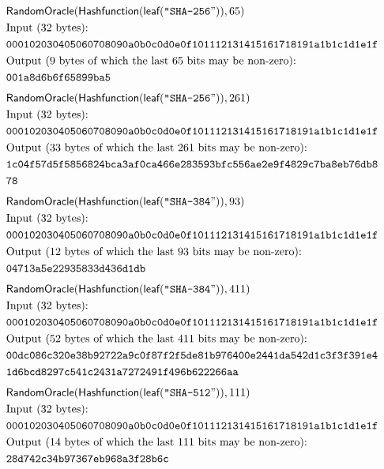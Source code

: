 \begin{align*}
&\textsf{RandomOracle}(\textsf{Hashfunction}(\textsf{leaf}(\texttt{"SHA-256}")),65)\\
&\textrm{Input (32 bytes):}\\
&\texttt{000102030405060708090a0b0c0d0e0f101112131415161718191a1b1c1d1e1f}\\
&\textrm{Output (9 bytes of which the last 65 bits may be non-zero):}\\
&\texttt{001a8d6b6f65899ba5}
\end{align*}
\begin{align*}
&\textsf{RandomOracle}(\textsf{Hashfunction}(\textsf{leaf}(\texttt{"SHA-256}")),261)\\
&\textrm{Input (32 bytes):}\\
&\texttt{000102030405060708090a0b0c0d0e0f101112131415161718191a1b1c1d1e1f}\\
&\textrm{Output (33 bytes of which the last 261 bits may be non-zero):}\\
&\texttt{1c04f57d5f5856824bca3af0ca466e283593bfc556ae2e9f4829c7ba8eb76db8}\\
&\texttt{78}
\end{align*}
\begin{align*}
&\textsf{RandomOracle}(\textsf{Hashfunction}(\textsf{leaf}(\texttt{"SHA-384}")),93)\\
&\textrm{Input (32 bytes):}\\
&\texttt{000102030405060708090a0b0c0d0e0f101112131415161718191a1b1c1d1e1f}\\
&\textrm{Output (12 bytes of which the last 93 bits may be non-zero):}\\
&\texttt{04713a5e22935833d436d1db}
\end{align*}
\begin{align*}
&\textsf{RandomOracle}(\textsf{Hashfunction}(\textsf{leaf}(\texttt{"SHA-384}")),411)\\
&\textrm{Input (32 bytes):}\\
&\texttt{000102030405060708090a0b0c0d0e0f101112131415161718191a1b1c1d1e1f}\\
&\textrm{Output (52 bytes of which the last 411 bits may be non-zero):}\\
&\texttt{00dc086c320e38b92722a9c0f87f2f5de81b976400e2441da542d1c3f3f391e4}\\
&\texttt{1d6bcd8297c541c2431a7272491f496b622266aa}
\end{align*}
\begin{align*}
&\textsf{RandomOracle}(\textsf{Hashfunction}(\textsf{leaf}(\texttt{"SHA-512}")),111)\\
&\textrm{Input (32 bytes):}\\
&\texttt{000102030405060708090a0b0c0d0e0f101112131415161718191a1b1c1d1e1f}\\
&\textrm{Output (14 bytes of which the last 111 bits may be non-zero):}\\
&\texttt{28d742c34b97367eb968a3f28b6c}
\end{align*}
